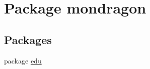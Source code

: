 \hypertarget{namespacemondragon}{}\section{Package mondragon}
\label{namespacemondragon}
\subsection*{Packages}
\begin{DoxyCompactItemize}
\item 
package \mbox{\hyperlink{namespacemondragon_1_1edu}{edu}}
\end{DoxyCompactItemize}
